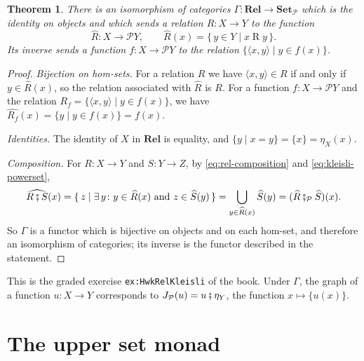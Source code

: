 \documentclass[11pt,a4paper]{article}
\theoremstyle{plain}
\newtheorem{theorem}{Theorem}[section]
\theoremstyle{definition}
\theoremstyle{remark}
\newcommand{\Cat}[1]{\mathbf{#1}}
\newcommand{\Set}{\Cat{Set}}
\newcommand{\Rel}{\Cat{Rel}}
\newcommand{\pow}{\mathcal{P}}
\newcommand{\SetP}{\Set_{\pow}}
\newcommand{\then}{\mathbin{\fatsemi}}
\newcommand{\thenP}{\mathbin{\fatsemi_{\pow}}}
\newcommand{\tup}[1]{\langle #1 \rangle}
\newcommand{\rel}[3]{#1 \mathrel{#2} #3}
\newcommand{\lbl}[1]{\nolinkurl{#1}}
\begin{document}
\begin{theorem}
    \label{thm:rel-kleisli}
    There is an isomorphism of categories $\Gamma \colon \Rel \to \SetP$ which is the identity on objects and which sends a relation $R \colon X \to Y$ to the function
    \begin{equation*}
        \widehat{R} \colon X \to \pow Y,
        \qquad
        \widehat{R}(x) = \{\, y \in Y \mid \rel{x}{R}{y} \,\}.
    \end{equation*}
    Its inverse sends a function $f \colon X \to \pow Y$ to the relation $\{ \tup{x,y} \mid y \in f(x) \}$.
\end{theorem}
\begin{proof}
    \emph{Bijection on hom-sets.}
    For a relation $R$ we have $\tup{x,y} \in R$ if and only if $y \in \widehat{R}(x)$, so the relation associated with $\widehat{R}$ is $R$.
    For a function $f \colon X \to \pow Y$ and the relation $R_f = \{ \tup{x,y} \mid y \in f(x) \}$, we have $\widehat{R_f}(x) = \{ y \mid y \in f(x) \} = f(x)$.

    \emph{Identities.}
    The identity of $X$ in $\Rel$ is equality, and $\{ y \mid x = y \} = \{x\} = \eta_X(x)$.

    \emph{Composition.}
    For $R \colon X \to Y$ and $S \colon Y \to Z$, by \cref{eq:rel-composition} and \cref{eq:kleisli-powerset},
    \begin{equation*}
        \widehat{R \then S}(x)
        = \{\, z \mid \exists\, y \colon y \in \widehat{R}(x) \text{ and } z \in \widehat{S}(y) \,\}
        = \bigcup_{y \in \widehat{R}(x)} \widehat{S}(y)
        = (\widehat{R} \thenP \widehat{S})(x).
    \end{equation*}
    So $\Gamma$ is a functor which is bijective on objects and on each hom-set, and therefore an isomorphism of categories; its inverse is the functor described in the statement.
\end{proof}

This is the graded exercise \lbl{ex:HwkRelKleisli} of the book.
Under $\Gamma$, the graph of a function $u \colon X \to Y$ corresponds to $J_{\pow}(u) = u \then \eta_Y$, the function $x \mapsto \{u(x)\}$.

\section{The upper set monad}
\label{sec:upper-set-monad}
\end{document}

